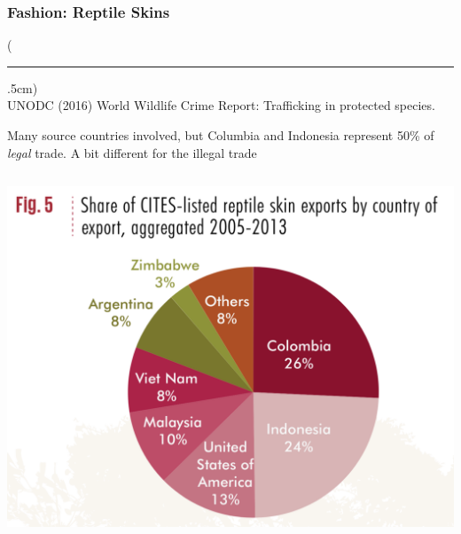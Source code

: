 \documentclass[10pt]{beamer}
\newenvironment{reference}[2]{%
	\begin{textblock*}{\textwidth}(#1,#2)
		\tiny\bgroup\color{gray}}{\egroup\end{textblock*}}
\begin{document}
\begin{frame}[t]
\frametitle{Fashion: Reptile Skins}
\vspace{0.25cm}

	\begin{reference}{4mm}{92mm}
		\rule{1.5cm}{0.25pt}\\
		UNODC (2016) World Wildlife Crime Report: Trafficking in protected species.
	\end{reference}
	
	Many \textcolor{myblue}{source} countries involved, but Columbia and Indonesia represent 50\% of \emph{legal} trade. A bit different for the illegal trade\\
	
	\vspace{0.25cm} 

	\begin{columns}
		\begin{column}{0.5\textwidth}
			\begin{center}
				\includegraphics[width=1.0\textwidth]{figures/fashion_legal.png}
			\end{center}
		\end{column}
		

\end{columns}
\end{frame}
\end{document}
